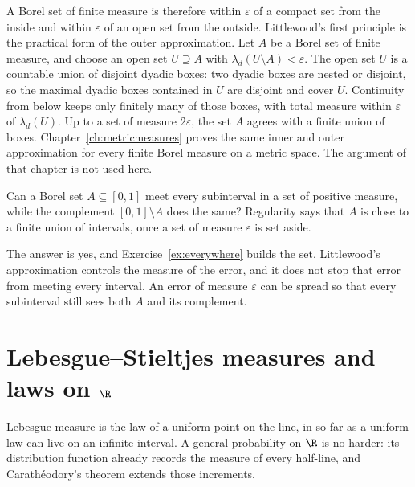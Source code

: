 A Borel set of finite measure is therefore within $\varepsilon$ of a compact set from the inside and within $\varepsilon$ of an open set from the outside.
Littlewood's first principle is the practical form of the outer approximation.
Let $A$ be a Borel set of finite measure, and choose an open set $U\supseteq A$ with $\lambda_d(U\setminus A)<\varepsilon$.
The open set $U$ is a countable union of disjoint dyadic boxes: two dyadic boxes are nested or disjoint, so the maximal dyadic boxes contained in $U$ are disjoint and cover $U$.
Continuity from below keeps only finitely many of those boxes, with total measure within $\varepsilon$ of $\lambda_d(U)$.
Up to a set of measure $2\varepsilon$, the set $A$ agrees with a finite union of boxes.
Chapter~\ref{ch:metricmeasures} proves the same inner and outer approximation for every finite Borel measure on a metric space.
The argument of that chapter is not used here.

\begin{think}
Can a Borel set $A\subseteq[0,1]$ meet every subinterval in a set of positive measure, while the complement $[0,1]\setminus A$ does the same?
Regularity says that $A$ is close to a finite union of intervals, once a set of measure $\varepsilon$ is set aside.
\end{think}

The answer is yes, and Exercise~\ref{ex:everywhere} builds the set.
Littlewood's approximation controls the measure of the error, and it does not stop that error from meeting every interval.
An error of measure $\varepsilon$ can be spread so that every subinterval still sees both $A$ and its complement.

\section{Lebesgue--Stieltjes measures and laws on \texorpdfstring{$\R$}{R}}

Lebesgue measure is the law of a uniform point on the line, in so far as a uniform law can live on an infinite interval.
A general probability on $\R$ is no harder: its distribution function already records the measure of every half-line, and Carath\'eodory's theorem extends those increments.

